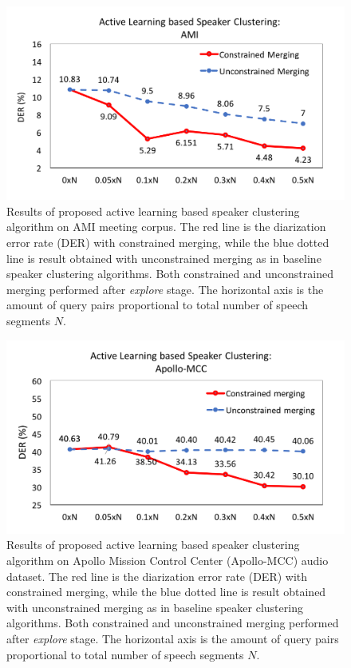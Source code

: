 \documentclass[journal]{IEEEtran}
\begin{document}
\begin{figure}[t]
	\centering
	\includegraphics[width=\linewidth]{figs/exp1_1}
	\caption{Results of proposed active learning based speaker clustering algorithm on AMI meeting corpus. The red line is the diarization error rate (DER) with constrained merging, while the blue dotted line is result obtained with unconstrained merging as in baseline speaker clustering algorithms. Both constrained and unconstrained merging performed after \textit{explore} stage. The horizontal axis is the amount of query pairs proportional to total number of speech segments $N$. }
	\label{exp1_1}
\end{figure}
\begin{figure}[t]
	\includegraphics[width=\linewidth]{figs/exp1_2}
	\caption{Results of proposed active learning based speaker clustering algorithm on Apollo Mission Control Center (Apollo-MCC) audio dataset. The red line is the diarization error rate (DER) with constrained merging, while the blue dotted line is result obtained with unconstrained merging as in baseline speaker clustering algorithms. Both constrained and unconstrained merging performed after \textit{explore} stage. The horizontal axis is the amount of query pairs proportional to total number of speech segments $N$.}
	\label{exp1_2}
\end{figure}
\end{document}
